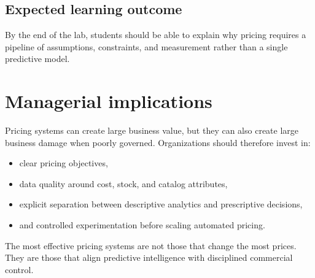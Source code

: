 \subsection{Expected learning outcome}
By the end of the lab, students should be able to explain why pricing requires a pipeline of assumptions, constraints, and measurement rather than a single predictive model.

\section{Managerial implications}
Pricing systems can create large business value, but they can also create large business damage when poorly governed.
Organizations should therefore invest in:
\begin{itemize}
  \item clear pricing objectives,
  \item data quality around cost, stock, and catalog attributes,
  \item explicit separation between descriptive analytics and prescriptive decisions,
  \item and controlled experimentation before scaling automated pricing.
\end{itemize}

The most effective pricing systems are not those that change the most prices.
They are those that align predictive intelligence with disciplined commercial control.

